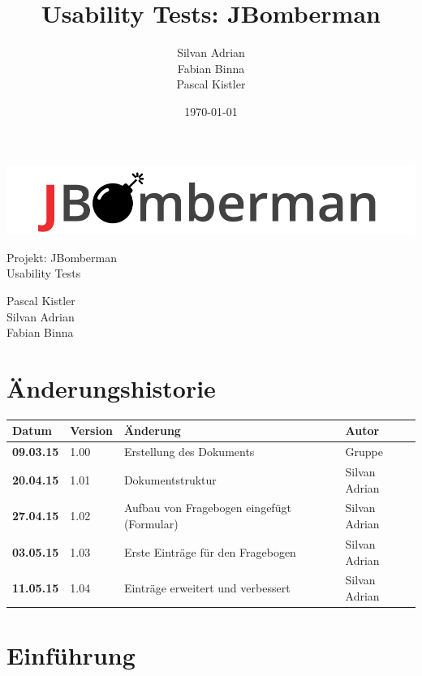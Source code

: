 \documentclass[11pt]{scrartcl}
\title{Usability Tests: JBomberman}
\author{Silvan Adrian \\ Fabian Binna \\ Pascal Kistler}
\date{\today{}}
\begin{document}
\def\arraystretch{1.5}
\begin{titlepage}
\begin{center}
\vspace{10em}
\includegraphics[scale=2]{jbomberman}
\vspace{10em}
\end{center}
\begin{center}
\huge {Projekt: JBomberman} \\
\huge {Usability Tests}
\end{center}
\begin{center}
\vspace{10em}
\LARGE {Pascal Kistler} \\
\LARGE {Silvan Adrian} \\
\LARGE {Fabian Binna}
\end{center}

\end{titlepage}

\newpage
\section{Änderungshistorie}
\label{sec:Änderungen}

\begin{tabularx}{\linewidth}{l l l l}
\textbf{Datum} & \textbf{Version} & \textbf{Änderung}  & \textbf{Autor} \\
\hline
\textbf{09.03.15} & 1.00 & Erstellung des Dokuments & Gruppe \\
\textbf{20.04.15} & 1.01 & Dokumentstruktur & Silvan Adrian \\
\textbf{27.04.15} & 1.02 & Aufbau von Fragebogen eingefügt (Formular) & Silvan Adrian \\
\bf{03.05.15} & 1.03 & Erste Einträge für den Fragebogen & Silvan Adrian \\
\bf{11.05.15} & 1.04 & Einträge erweitert und verbessert & Silvan Adrian \\
\end{tabularx}

\newpage
\tableofcontents
\newpage
\section{Einführung}
\end{document}
